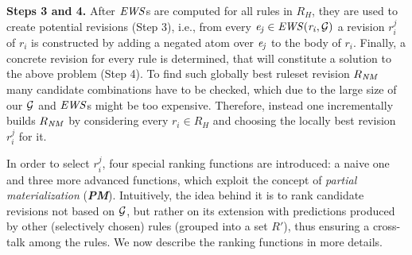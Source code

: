 \noindent \textbf{Steps 3 and 4.} After $\mathit{EWS}$s are computed for all rules in $R_H$, they are used
 to create potential revisions (Step 3), i.e., from every $\mathit{e_j}\in \mathit{EWS(r_i,\mathcal{G})}$ a revision $r^j_i$ of $r_i$ is constructed by adding a negated atom over $\mathit{e_j}$ to the body of $r_i$. Finally, a concrete revision for every rule is determined, that will constitute a solution to the above problem (Step 4). To find such globally best ruleset revision $R_{\mathit{NM}}$ many candidate combinations have to be checked, which due to the large size of our $\mathcal{G}$ and $\mathit{EWS}$s might be too expensive. Therefore, instead %
one incrementally builds $R_{\mathit{NM}}$ by considering every $r_i \in
R_{H}$ and choosing the locally best revision $r^j_i$ %
for it.

In order to select %
$r^j_i$, four special ranking functions are introduced: a naive one and three more advanced functions, which exploit the concept of \emph{partial materialization} (\textbf{\em PM}). Intuitively, the idea behind it is to rank candidate revisions not based on $\mathcal{G}$, but rather on its extension with predictions produced by other (selectively chosen) rules (grouped into a set $R'$), thus ensuring a cross-talk among the rules. We now describe the ranking functions in more details.

